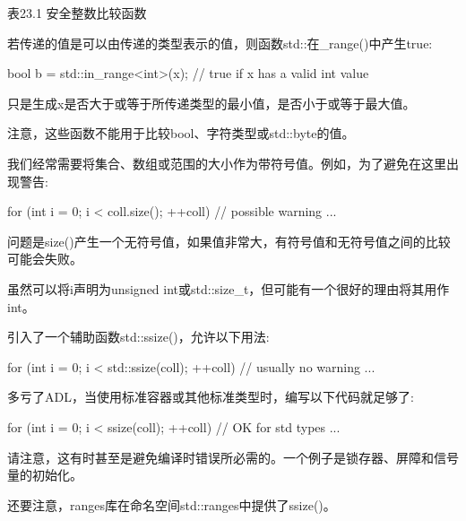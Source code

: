 \begin{center}
表23.1 安全整数比较函数
\end{center}

若传递的值是可以由传递的类型表示的值，则函数std::在\_range()中产生true:

\begin{cpp}
bool b = std::in_range<int>(x); // true if x has a valid int value
\end{cpp}

只是生成x是否大于或等于所传递类型的最小值，是否小于或等于最大值。

注意，这些函数不能用于比较bool、字符类型或std::byte的值。


我们经常需要将集合、数组或范围的大小作为带符号值。例如，为了避免在这里出现警告:

\begin{cpp}
for (int i = 0; i < coll.size(); ++coll) { // possible warning
	...
}
\end{cpp}

问题是size()产生一个无符号值，如果值非常大，有符号值和无符号值之间的比较可能会失败。

虽然可以将i声明为unsigned int或std::size\_t，但可能有一个很好的理由将其用作int。

引入了一个辅助函数std::ssize()，允许以下用法:

\begin{cpp}
for (int i = 0; i < std::ssize(coll); ++coll) { // usually no warning
	...
}
\end{cpp}

多亏了ADL，当使用标准容器或其他标准类型时，编写以下代码就足够了:

\begin{cpp}
for (int i = 0; i < ssize(coll); ++coll) { // OK for std types
	...
}
\end{cpp}

请注意，这有时甚至是避免编译时错误所必需的。一个例子是锁存器、屏障和信号量的初始化。

还要注意，ranges库在命名空间std::ranges中提供了ssize()。
















